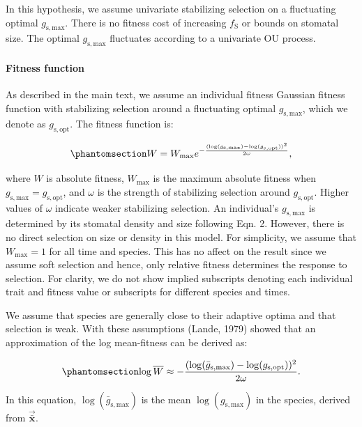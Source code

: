 \documentclass[
  letterpaper,
  DIV=11,
  numbers=noendperiod]{scrartcl}
\let\oldparagraph\paragraph
\renewcommand{\paragraph}[1]{\oldparagraph{#1}\mbox{}}
\begin{document}
In this hypothesis, we assume univariate stabilizing selection on a
fluctuating optimal \(g_\mathrm{s,max}\). There is no fitness cost of
increasing \(f_\mathrm{S}\) or bounds on stomatal size. The optimal
\(g_\mathrm{s,max}\) fluctuates according to a univariate OU process.

\paragraph{Fitness function}\label{sec-fitness-function1}

As described in the main text, we assume an individual fitness Gaussian
fitness function with stabilizing selection around a fluctuating optimal
\(g_\mathrm{s,max}\), which we denote as \(g_\mathrm{s,opt}\). The
fitness function is:

\begin{equation}\phantomsection\label{eq-W1}{W = W_\mathrm{max} e ^ {-\frac{(\log (g_\mathrm{s,max}) - \log (g_\mathrm{s,opt})) ^ 2}{2 \omega}},}\end{equation}

where \(W\) is absolute fitness, \(W_\mathrm{max}\) is the maximum
absolute fitness when \(g_\mathrm{s,max} = g_\mathrm{s,opt}\), and
\(\omega\) is the strength of stabilizing selection around
\(g_\mathrm{s,opt}\). Higher values of \(\omega\) indicate weaker
stabilizing selection. An individual's \(g_\mathrm{s,max}\) is
determined by its stomatal density and size following Eqn. 2. However,
there is no direct selection on size or density in this model. For
simplicity, we assume that \(W_\mathrm{max} = 1\) for all time and
species. This has no affect on the result since we assume soft selection
and hence, only relative fitness determines the response to selection.
For clarity, we do not show implied subscripts denoting each individual
trait and fitness value or subscripts for different species and times.

We assume that species are generally close to their adaptive optima and
that selection is weak. With these assumptions (Lande, 1979) showed that
an approximation of the log mean-fitness can be derived as:

\begin{equation}\phantomsection\label{eq-logW1}{\log \overline{W} \approx -\frac{(\log (\bar{g}_\mathrm{s,max}) - \log (g_\mathrm{s,opt}) )^ 2}{2 \omega}.}\end{equation}

In this equation, \(\log (\bar{g}_\mathrm{s,max})\) is the mean
\(\log(g_\mathrm{s,max})\) in the species, derived from
\(\vec{\bar{\mathbf{x}}}\).
\end{document}

